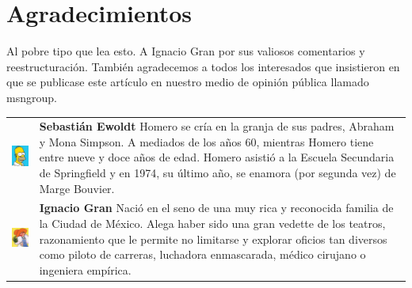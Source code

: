 \documentclass[fleqn,10pt]{AmateCodex} %
\begin{document}
\section*{Agradecimientos} %

Al pobre tipo que lea esto. A Ignacio Gran por sus
valiosos comentarios y reestructuración. También
agradecemos a todos los interesados que insistieron
en que se publicase este artículo en nuestro medio de
opinión pública llamado msngroup.




\begin{center}
\begin{tabular}{m{4cm} m{4cm}}
\includegraphics{foto_autor/homero_simpson.jpg} & \textbf{Sebastián Ewoldt} Homero se cría en la granja de sus padres, Abraham y Mona Simpson. A mediados de los años 60, mientras Homero tiene entre nueve y doce años de edad. Homero asistió a la Escuela Secundaria de Springfield y en 1974, su último año, se enamora (por segunda vez) de Marge Bouvier. \\
\includegraphics{foto_autor/borola-burron2.png} & \textbf{Ignacio Gran} Nació en el seno de una muy rica y reconocida familia de la Ciudad de México. Alega haber sido una gran vedette de los teatros, razonamiento que le permite no limitarse y explorar oficios tan diversos como piloto de carreras, luchadora enmascarada, médico cirujano o ingeniera empírica.
\end{tabular}
\end{center}
\end{document}
